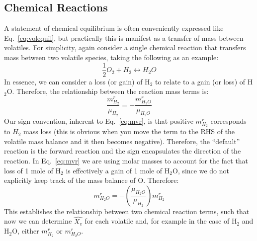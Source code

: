 \subsection{Chemical Reactions}
\label{sect:chemreact}
A statement of chemical equilibrium is often conveniently expressed like Eq.~\ref{eq:volequil}, but practically this is manifest as a transfer of mass between volatiles.  For simplicity, again consider a single chemical reaction that transfers mass between two volatile species, taking the following as an example:
\begin{equation}
    \frac{1}{2} O_2 + H_2 \leftrightarrow H_2O
    \label{eq:reaction}
\end{equation}
In essence, we can consider a loss (or gain) of H$_2$ to relate to a gain (or loss) of H$_2$O.  Therefore, the relationship between the reaction mass terms is:
\begin{equation}
\frac{m_{H_2}^r}{\mu_{H_2}} = -\frac{m_{H_2O}^r}{\mu_{H_2O}}
\label{eq:mvr}
\end{equation}
Our sign convention, inherent to Eq.~\ref{eq:mvr}, is that positive $m_{H_2}^r$ corresponds to $H_2$ mass loss (this is obvious when you move the term to the RHS of the volatile mass balance and it then becomes negative).  Therefore, the ``default'' reaction is the forward reaction and the sign encapsulates the direction of the reaction.  In Eq.~\ref{eq:mvr} we are using molar masses to account for the fact that loss of 1 mole of H$_2$ is effectively a gain of 1 mole of H$_2$O, since we do not explicitly keep track of the mass balance of O.  Therefore:
\begin{equation}
m_{H_2O}^r = - \left( \frac{\mu_{H_2O}}{\mu_{H_2}} \right) m_{H_2}^r
\label{eq:mvr_final}
\end{equation}
This establishes the relationship between two chemical reaction terms, such that now we can determine $\hat{X_v}$ for each volatile and, for example in the case of H$_2$ and H$_2$O, either $m_{H_2}^r$ or $m_{H_2O}^r$.  

